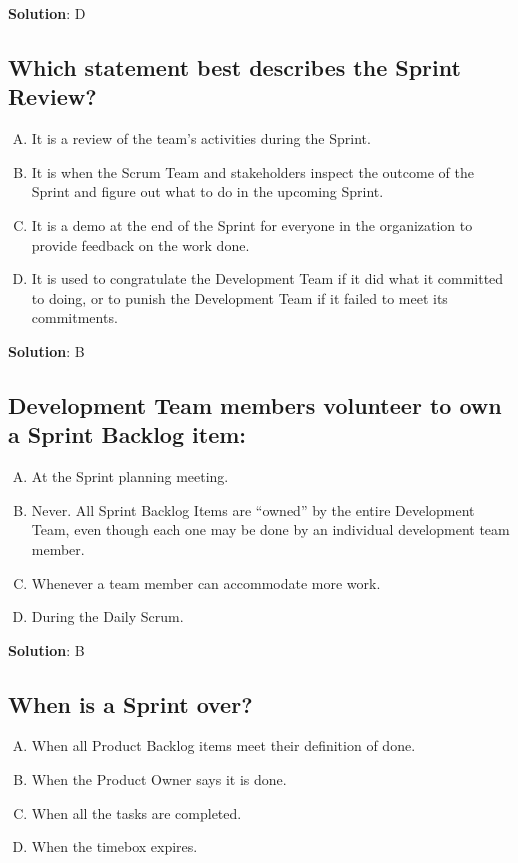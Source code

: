 \textbf{Solution}: D


\subsection{Which statement best describes the Sprint Review?}
\begin{enumerate}[A)]
  \item It is a review of the team's activities during the Sprint.
  \item It is when the Scrum Team and stakeholders inspect the outcome of the Sprint and figure out what to do in the upcoming Sprint.
  \item It is a demo at the end of the Sprint for everyone in the organization to provide feedback on the work done.
  \item It is used to congratulate the Development Team if it did what it committed to doing, or to punish the Development Team if it failed to meet its commitments.
\end{enumerate}


\textbf{Solution}: B


\subsection{Development Team members volunteer to own a Sprint Backlog item:}
\begin{enumerate}[A)]
  \item At the Sprint planning meeting.
  \item Never. All Sprint Backlog Items are \enquote{owned} by the entire Development Team, even though each one may be done by an individual development team member.
  \item Whenever a team member can accommodate more work.
  \item During the Daily Scrum.
\end{enumerate}


\textbf{Solution}: B


\subsection{When is a Sprint over?}
\begin{enumerate}[A)]
  \item When all Product Backlog items meet their definition of done.
  \item When the Product Owner says it is done.
  \item When all the tasks are completed.
  \item When the timebox expires.
\end{enumerate}


